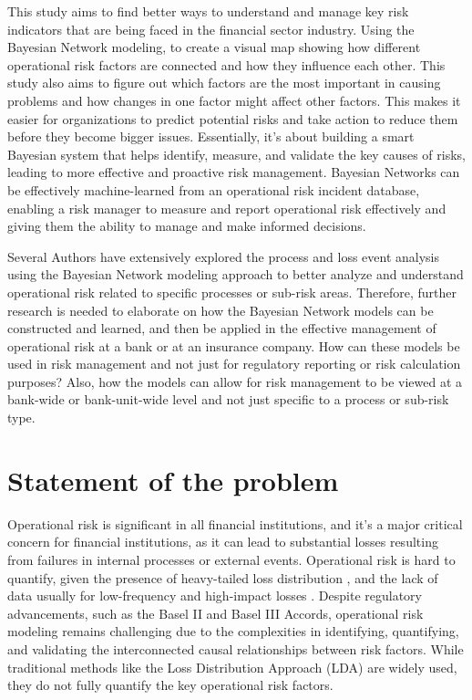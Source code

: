This study aims to find better ways to understand and manage key risk indicators that are being faced in the financial sector industry. Using the Bayesian Network modeling, to create a visual map showing how different operational risk factors are connected and how they influence each other. This study also aims to figure out which factors are the most important in causing problems and how changes in one factor might affect other factors. This makes it easier for organizations to predict potential risks and take action to reduce them before they become bigger issues. Essentially, it's about building a smart Bayesian system that helps identify, measure, and validate the key causes of risks, leading to more effective and proactive risk management. Bayesian Networks can be effectively machine-learned from an operational risk incident database, enabling a risk manager to measure and report operational risk effectively and giving them the ability to manage and make informed decisions.

Several Authors have extensively explored the process and loss event analysis using the Bayesian Network modeling approach to better analyze and understand operational risk related to specific processes or sub-risk areas. Therefore, further research is needed to elaborate on how the Bayesian Network models can be constructed and learned, and then be applied in the effective management of operational risk at a bank or at an insurance company. How can these models be used in risk management and not just for regulatory reporting or risk calculation purposes? Also, how the models can allow for risk management to be viewed at a bank-wide or bank-unit-wide level and not just specific to a process or sub-risk type.

\section{Statement of the problem}

Operational risk is significant in all financial institutions, and it’s a major critical concern for financial institutions, as it can lead to substantial losses resulting from failures in internal processes or external events. Operational risk is hard to quantify, given the presence of heavy-tailed loss distribution \parencite{johanna2022capital}, and the lack of data usually for low-frequency and high-impact losses  \parencite{article}.  Despite regulatory advancements, such as the Basel II and Basel III Accords, operational risk modeling remains challenging due to the complexities in identifying, quantifying, and validating the interconnected causal relationships between risk factors. While traditional methods like the Loss Distribution Approach (LDA) are widely used, they do not fully quantify the key operational risk factors. 

